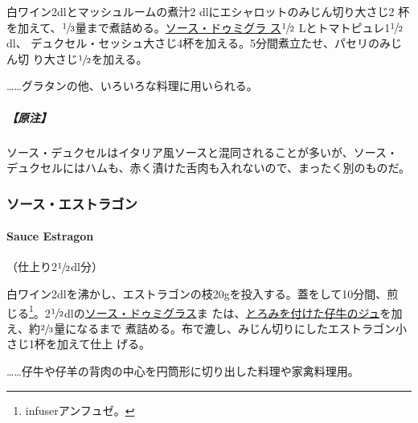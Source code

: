 白ワイン2dlとマッシュルームの煮汁2 dlにエシャロットのみじん切り大さじ2
杯を加えて、\(\sfrac{1}{3}\)量まで煮詰める。\protect\hyperlink{sauce-demi-glace}{ソース・ドゥミグラ
ス}\(\sfrac{1}{2}\) Lとトマトピュレ1\(\sfrac{1}{2}\) dl、
デュクセル・セッシュ大さじ4杯を加える。5分間煮立たせ、パセリのみじん切
り大さじ\(\sfrac{1}{2}\)を加える。

\ldots{}\ldots{}グラタンの他、いろいろな料理に用いられる。

\hypertarget{ux539fux6ce8-1}{%
\subparagraph{【原注】}\label{ux539fux6ce8-1}}

ソース・デュクセルはイタリア風ソースと混同されることが多いが、ソース・
デュクセルにはハムも、赤く漬けた舌肉も入れないので、まったく別のものだ。

\maeaki

\hypertarget{ux30bdux30fcux30b9ux30a8ux30b9ux30c8ux30e9ux30b4ux30f3}{%
\subsubsection{ソース・エストラゴン}\label{ux30bdux30fcux30b9ux30a8ux30b9ux30c8ux30e9ux30b4ux30f3}}

\hypertarget{sauce-estragon}{%
\paragraph{Sauce Estragon}\label{sauce-estragon}}


（仕上り2\(\sfrac{1}{2}\)dl分）

白ワイン2dlを沸かし、エストラゴンの枝20gを投入する。蓋をして10分間、煎
じる\footnote{infuserアンフュゼ。}。2\(\sfrac{1}{2}\)dlの\protect\hyperlink{sauce-demi-glace}{ソース・ドゥミグラス}ま
たは、\protect\hyperlink{jus-de-veau-lie}{とろみを付けた仔牛のジュ}を加え、約\(\sfrac{2}{3}\)量になるまで
煮詰める。布で漉し、みじん切りにしたエストラゴン小さじ1杯を加えて仕上
げる。

\ldots{}\ldots{}仔牛や仔羊の背肉の中心を円筒形に切り出した料理や家禽料理用。

\maeaki

